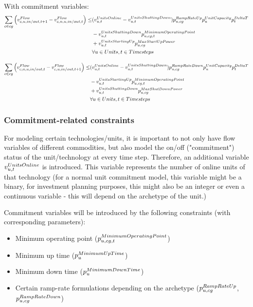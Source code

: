 With commitment variables:
\begin{align} \label{eq:updwardrampingconstraintwithcommitmentvariables}
\sum_{\commodity \in cg} \Big( \vFlow[\commodity,\unit,in/out,\timestep+1] - \vFlow \Big) \le & (\vUnitsOnline-\vUnitsShuttingDown) \pRampRateUp \pUnitCapacity \pDeltaT \nonumber \\
& - \vUnitsShuttingDown \pMinimumOperatingPoint \nonumber \\
& +\vUnitsStartingUp \pMaxStartUpPower \nonumber \\
& \forall \units, \timesteps
\end{align}

\begin{align} \label{eq:downdwardrampingconstraintwithcommitmentvariables}
\sum_{\commodity \in cg} \Big( \vFlow - \vFlow[\commodity,\unit,in/out,\timestep+1] \Big) \le &(\vUnitsOnline-\vUnitsShuttingDown) \pRampRateDown \pUnitCapacity \pDeltaT \nonumber \\
& - \vUnitsStartingUp \pMinimumOperatingPoint \nonumber \\
& + \vUnitsShuttingDown \pMaxShutDownPower \nonumber \\
& \forall \units, \timesteps
\end{align}






\subsubsection{Commitment-related constraints}
For modeling certain technologies/units, it is important to not only have flow variables of different commodities, but also model the on/off ("commitment") status of the unit/technology at every time step. Therefore, an additional variable $\vUnitsOnline$ is introduced. This variable represents the number of online units of that technology (for a normal unit commitment model, this variable might be a binary, for investment planning purposes, this might also be an integer or even a continuous variable - this will depend on the archetype of the unit.)

Commitment variables will be introduced by the following constraints (with corresponding parameters):
\begin{itemize}
	\item Minimum operating point ($\pMinimumOperatingPoint$)
	\item Minimum up time ($\pMinimumUpTime$)
	\item Minimum down time ($\pMinimumDownTime$)
	\item Certain ramp-rate formulations depending on the archetype ($\pRampRateUp$, $\pRampRateDown$)
\end{itemize}

